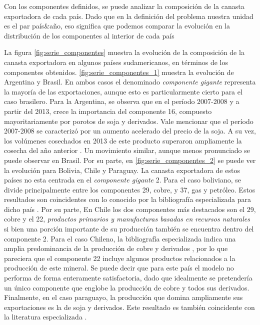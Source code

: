 \documentclass[class=article, crop=false]{standalone}
\begin{document}
Con los componentes definidos, se puede analizar la composición de la canasta exportadora de cada país. Dado que en la definición del problema nuestra unidad es el par país\&año, eso significa que podemos comparar la evolución en la distribución de los componentes al interior de cada país

La figura \ref{fig:serie_componentes} muestra la evolución de la composición de la canasta exportadora en algunos países sudamericanos, en términos de los componentes obtenidos. \ref{fig:serie_componentes_1} muestra la evolución de Argentina y Brasil. En ambos casos el denominado \textit{componente gigante} representa la mayoría de las exportaciones, aunque esto es particularmente cierto para el caso brasilero. Para la Argentina, se observa que en el período 2007-2008 y a partir del 2013, crece la importancia del componente 16, compuesto mayoritariamente por porotos de soja y derivados. Vale mencionar que el período 2007-2008 se caracterizó por un aumento acelerado del precio de la soja. A su vez, los volúmenes cosechados en 2013 de este producto superaron ampliamente la cosecha del año anterior \citep{ybran2016informe}. Un movimiento similar, aunque menos pronunciado se puede observar en Brasil. Por su parte, en \ref{fig:serie_componentes_2} se puede ver la evolución para Bolivia, Chile y Paraguay. La canasta exportadora de estos países no esta centrada en el \textit{componente gigante} 2. Para el caso boliviano, se divide principalmente entre los componentes 29, cobre, y 37, gas y petróleo. Estos resultados son coincidentes con lo conocido por la bibliografía especializada para dicho país \citep{auty2002sustaining, chavez2016can}. Por su parte, En Chile los dos componentes más destacados son el 29, cobre y el 22, \textit{productos primarios y manufacturas basadas en recursos naturales} si bien una porción importante de su producción también se encuentra dentro del componente 2. Para el caso Chileno, la bibliografía especializada indica una amplia predominancia de la producción de cobre y derivados \citep{moran2014multinational}, por lo que pareciera que el componente 22 incluye algunos productos relacionados a la producción de este mineral. Se puede decir que para este país el modelo no performa de forma enteramente satisfactoria, dado que idealmente se pretendería un único componente que englobe la producción de cobre y todos sus derivados. Finalmente, en el caso paraguayo, la producción que domina ampliamente sus exportaciones es la de soja y derivados. Este resultado es también coincidente con la literatura especializada \citep{fogel2005enclave}.
\end{document}
